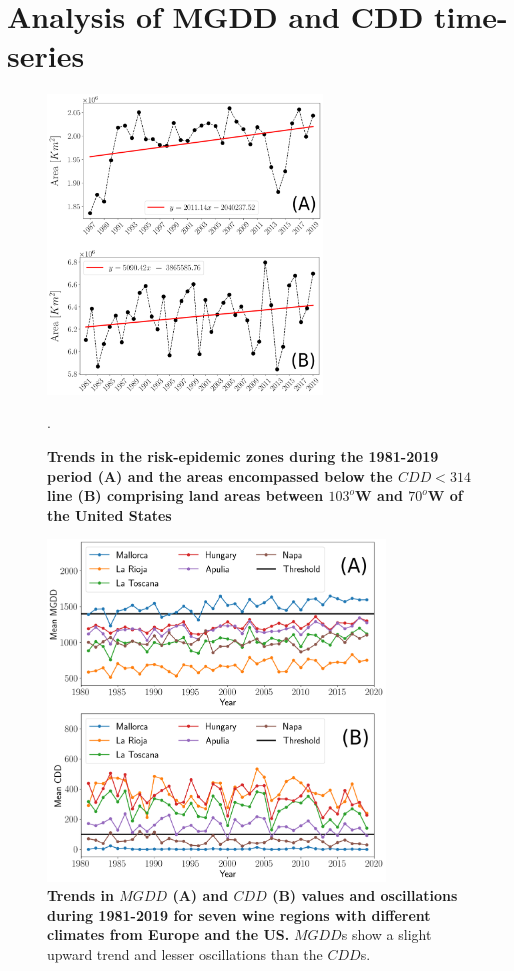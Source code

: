 \section{Analysis of MGDD and CDD time-series}

\begin{figure}[H]
    \centering
    \includegraphics[width=0.65\textwidth]{Figures/CDD_risk_evol_USA.png}
    \caption[Comparison of risk areas and low CDD areas]{\textbf{Trends in the
            risk-epidemic zones during the 1981-2019
            period (A) and the areas encompassed below the $CDD < 314$ line (B)
            comprising
            land areas between $103^o$W and $70^o$W of the United States}}.
    \label{fig:sup_CDD_evol} %
\end{figure}

\begin{figure}[H]
    \centering
    \includegraphics[width=0.8\textwidth]{Figures/Mean_MGDD_CDD_sites.png}
    \caption[MGDD and CDD oscillations in different wine-growing
        regions]{\textbf{Trends in $MGDD$ (A) and $CDD$ (B) values and
            oscillations during 1981-2019 for seven wine regions with different
            climates
            from Europe and the US.} $MGDD$s show a slight upward trend and
        lesser
        oscillations than the $CDD$s.}
    \label{fig:sup_climatic_oscilations} %
\end{figure}

